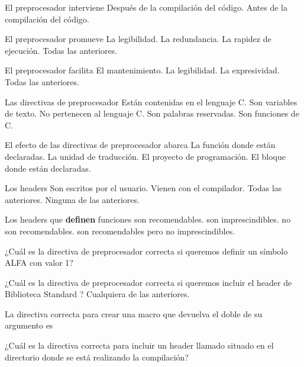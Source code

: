 
\begin{preguntas}
\label{sec:tc-preprocesador-preg}
\question El preprocesador interviene
\choice Después de la compilación del código.
\correctchoice Antes de la compilación del código.

\question El preprocesador promueve
\correctchoice La legibilidad.
\choice La redundancia.
\choice La rapidez de ejecución.
\choice Todas las anteriores.

\question El preprocesador facilita
\choice El mantenimiento.
\choice La legibilidad.
\choice La expresividad.
\correctchoice Todas las anteriores.

\question Las directivas de preprocesador
\choice Están contenidas en el lenguaje C.
\choice Son variables de texto.
\correctchoice No pertenecen al lenguaje C.
\choice Son palabras reservadas.
\choice Son funciones de C.

\question El efecto de las directivas de preprocesador abarca
\choice La función donde están declaradas.
\correctchoice La unidad de traducción.
\choice El proyecto de programación.
\choice El bloque donde están declaradas.

\question Los headers
\choice Son escritos por el usuario.
\choice Vienen con el compilador.
\correctchoice Todas las anteriores.
\choice Ninguna de las anteriores.

\question Los headers que \textbf{definen} funciones
\choice son recomendables.
\choice son imprescindibles.
\correctchoice no son recomendables.
\choice son recomendables pero no imprescindibles.

\question ¿Cuál es la directiva de preprocesador correcta si queremos definir un símbolo ALFA con valor 1?
\choice {}
\choice {}
\correctchoice {}
\choice {}

\question ¿Cuál es la directiva de preprocesador correcta si queremos incluir el header de Biblioteca Standard ?
\choice {}
\choice {}
\correctchoice {}
\choice Cualquiera de las anteriores.

\question La directiva correcta para crear una macro que devuelva el doble de su argumento es
\choice {}
\choice {}
\correctchoice {}
\choice {}
\choice {}

\question ¿Cuál es la directiva correcta para incluir un header llamado   situado en el directorio donde se está realizando la compilación?
\choice {}
\choice {}
\correctchoice {}


\end{preguntas}
